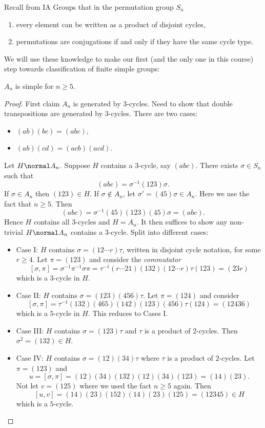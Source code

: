 \documentclass[a4paper]{article}
\theoremstyle{definition}
\begin{document}
Recall from IA Groups that in the permutation group \(S_n\)
\begin{enumerate}
\item every element can be written as a product of disjoint cycles,
\item permutations are conjugations if and only if they have the same cycle type.
\end{enumerate}

We will use these knowledge to make our first (and the only one in this course) step towards classification of finite simple groups:

\begin{theorem}
  \(A_n\) is simple for \(n \geq 5\).
\end{theorem}

\begin{proof}
  First claim \(A_n\) is generated by \(3\)-cycles. Need to show that double transpositions are generated by \(3\)-cycles. There are two cases:
  \begin{itemize}
  \item \((ab)(bc) = (abc)\),
  \item \((ab)(cd) = (acb)(acd)\).
  \end{itemize}

  Let \(H \normal A_n\). Suppose \(H\) contains a \(3\)-cycle, say \((abc)\). There exists \(\sigma \in S_n\) such that
  \[
    (abc) = \sigma^{-1}(123)\sigma.
  \]
  If \(\sigma \in A_n\) then \((123) \in H\). If \(\sigma \notin A_n\), let \(\sigma' = (45)\sigma \in A_n\). Here we use the fact that \(n \geq 5\). Then
  \[
    (abc) = \sigma^{-1}(45)(123)(45)\sigma = (abc).
  \]
  Hence \(H\) contains all \(3\)-cycles and \(H = A_n\). It then suffices to show any non-trivial \(H \normal A_n\) contains a \(3\)-cycle. Split into different cases:
  \begin{itemize}
  \item Case I: \(H\) contains \(\sigma = (12 \cdots r)\tau\), written in disjoint cycle notation, for some \( r \geq 4\). Let \(\pi = (123)\) and consider the \emph{commutator}
    \[
      [\sigma, \pi] = \sigma^{-1}\pi^{-1}\sigma\pi = \tau^{-1}(r \cdots 21)(132)(12 \cdots r)\tau(123) = (23r)
    \]
    which is a \(3\)-cycle in \(H\).
  \item Case II: \(H\) contains \(\sigma = (123)(456)\tau\). Let \(\pi = (124)\) and consider
    \[
      [\sigma, \pi] = \tau^{-1}(132)(465)(142)(123)(456)\tau(124) = (12436)
    \]
    which is a \(5\)-cycle in \(H\). This reduces to Cases I.
  \item Case III: \(H\) contains \(\sigma = (123)\tau\) and \(\tau\) is a product of \(2\)-cycles. Then \(\sigma^2 = (132) \in H\).
  \item Case IV: \(H\) contains \(\sigma = (12)(34)\tau\) where \(\tau\) is a product of \(2\)-cycles. Let \(\pi = (123)\) and
    \[
      u = [\sigma, \pi] = (12)(34)(132)(12)(34)(123) = (14)(23).
    \]
    Not let \(v = (125)\) where we used the fact \(n \geq 5\) again. Then
    \[
      [u, v] = (14)(23)(152)(14)(23)(125) = (12345) \in H
    \]
    which is a \(5\)-cycle.
  \end{itemize}
\end{proof}
\end{document}
